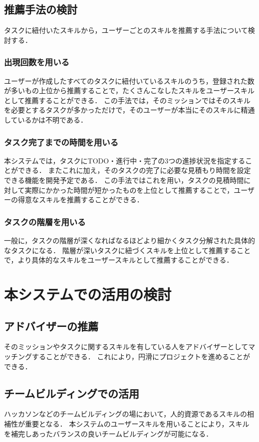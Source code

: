 \subsection{推薦手法の検討}
タスクに紐付いたスキルから，ユーザーごとのスキルを推薦する手法について検討する．

\subsubsection{出現回数を用いる}
ユーザーが作成したすべてのタスクに紐付いているスキルのうち，登録された数が多いもの上位から推薦することで，たくさんこなしたスキルをユーザースキルとして推薦することができる．
この手法では，そのミッションではそのスキルを必要とするタスクが多かっただけで，そのユーザーが本当にそのスキルに精通しているかは不明である．

\subsubsection{タスク完了までの時間を用いる}
本システムでは，タスクにTODO・進行中・完了の3つの進捗状況を指定することができる．
またこれに加え，そのタスクの完了に必要な見積もり時間を設定できる機能を開発予定である．
この手法ではこれを用い，タスクの見積時間に対して実際にかかった時間が短かったものを上位として推薦することで，ユーザーの得意なスキルを推薦することができる．

\subsubsection{タスクの階層を用いる}
一般に，タスクの階層が深くなればなるほどより細かくタスク分解された具体的なタスクになる．
階層が深いタスクに紐づくスキルを上位として推薦することで，より具体的なスキルをユーザースキルとして推薦することができる．

\section{本システムでの活用の検討}

\subsection{アドバイザーの推薦}
そのミッションやタスクに関するスキルを有している人をアドバイザーとしてマッチングすることができる．
これにより，円滑にプロジェクトを進めることができる．

\subsection{チームビルディングでの活用}
ハッカソンなどのチームビルディングの場において，人的資源であるスキルの相補性が重要となる．
本システムのユーザースキルを用いることにより，スキルを補完しあったバランスの良いチームビルディングが可能になる．

